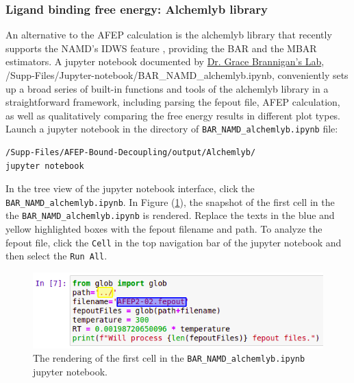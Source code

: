 \documentclass[9pt,tutorial]{livecoms}
\begin{document}
\subsubsection{Ligand binding free energy: Alchemlyb library}
An alternative to the AFEP calculation is the alchemlyb library that recently supports the NAMD's IDWS feature \cite{chodera2016simple, shirts2008statistically}, providing the BAR and the MBAR estimators. A jupyter notebook documented by \href{https://github.com/BranniganLab/safep}{Dr. Grace Brannigan's Lab}, /Supp-Files/Jupyter-notebook/BAR\_NAMD\_alchemlyb.ipynb, conveniently sets up a broad series of built-in functions and tools of the alchemlyb library in a straightforward framework, including parsing the fepout file, AFEP calculation, as well as qualitatively comparing the free energy results in different plot types. Launch a jupyter notebook in the directory of \texttt{BAR\_NAMD\_alchemlyb.ipynb} file:
\begin{verbatim}
/Supp-Files/AFEP-Bound-Decoupling/output/Alchemlyb/
jupyter notebook
\end{verbatim}
In the tree view of the jupyter notebook interface, click the \texttt{BAR\_NAMD\_alchemlyb.ipynb}. In Figure (\ref{fig:BAR_NAMD_alchemlyb}), the snapshot of the first cell in the the \texttt{BAR\_NAMD\_alchemlyb.ipynb} is rendered. Replace the texts in the blue and yellow highlighted boxes with the fepout filename and path. To analyze the fepout file, click the \texttt{Cell} in the top navigation bar of the jupyter notebook and then select the \texttt{Run All}. 
\begin{figure}[h!]
\centering
\includegraphics[width=\linewidth]{ipynb.png}
\caption{The rendering of the first cell in the \texttt{BAR\_NAMD\_alchemlyb.ipynb} jupyter notebook.}\label{fig:BAR_NAMD_alchemlyb}
\end{figure}
\end{document}
